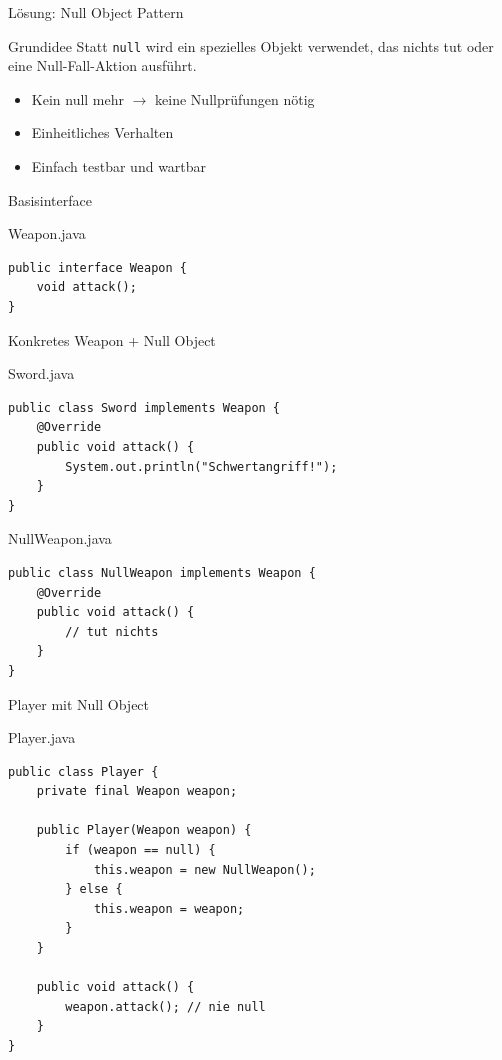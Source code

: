 \begin{frame}{Lösung: Null Object Pattern}
    \begin{block}{Grundidee}
        Statt \texttt{null} wird ein spezielles Objekt verwendet, das nichts tut
        oder eine Null-Fall-Aktion ausführt.
    \end{block}
    \pause
    \begin{itemize}
        \item Kein null mehr $\rightarrow$ keine Nullprüfungen nötig
        \item Einheitliches Verhalten
        \item Einfach testbar und wartbar
    \end{itemize}
\end{frame}

\begin{frame}[fragile]{Basisinterface}
	\begin{exampleblock}{Weapon.java}
		\begin{lstlisting}
public interface Weapon {
    void attack();
}
	\end{lstlisting}
	\end{exampleblock}
\end{frame}

\begin{frame}[fragile]{Konkretes Weapon + Null Object}
	\begin{exampleblock}{Sword.java}
		\begin{lstlisting}
public class Sword implements Weapon {
    @Override
    public void attack() {
        System.out.println("Schwertangriff!");
    }
}
		\end{lstlisting}
	\end{exampleblock}
	
	\begin{exampleblock}{NullWeapon.java}
		\begin{lstlisting}
public class NullWeapon implements Weapon {
    @Override
    public void attack() {
        // tut nichts
    }
}
		\end{lstlisting}
	\end{exampleblock}
\end{frame}

\begin{frame}[fragile]{Player mit Null Object}
	\begin{exampleblock}{Player.java}
		\begin{lstlisting}
public class Player {
    private final Weapon weapon;

    public Player(Weapon weapon) {
        if (weapon == null) {
        	this.weapon = new NullWeapon();
        } else {
        	this.weapon = weapon;
        }
    }

    public void attack() {
        weapon.attack(); // nie null
    }
}
		\end{lstlisting}
	\end{exampleblock}
\end{frame}

